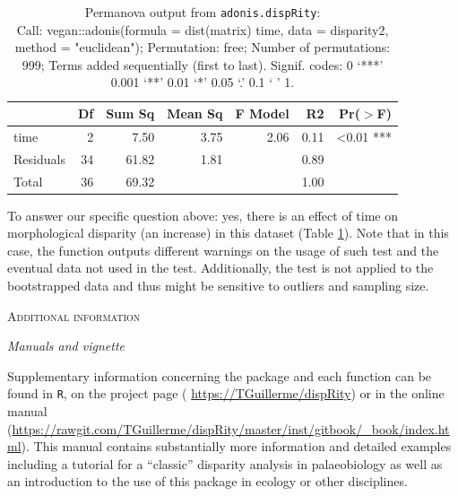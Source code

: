 \documentclass[12pt,letterpaper]{article}
\renewcommand{\section}[1]{%
\bigskip
\begin{center}
\begin{Large}
\normalfont\scshape #1
\medskip
\end{Large}
\end{center}}
\renewcommand{\subsection}[1]{%
\bigskip
\begin{center}
\begin{large}
\normalfont\itshape #1
\end{large}
\end{center}}
\begin{document}
\begin{table}[ht]
\centering
\begin{tabular}{lrrrrrr}
  \hline
              & Df & Sum Sq & Mean Sq & F Model & R2   & Pr($>$F) \\ 
  \hline
    time      & 2  &  7.50 & 3.75     & 2.06    & 0.11 & <0.01 *** \\ 
    Residuals & 34 & 61.82 & 1.81     &         & 0.89 & \\
    Total     & 36 & 69.32 &          &         & 1.00 & \\ 
   \hline
\end{tabular}
\caption{
Permanova output from \texttt{adonis.dispRity}:\\
Call: vegan::adonis(formula = dist(matrix) \texttildelow time, data = disparity2, method = "euclidean"); Permutation: free; Number of permutations: 999; Terms added sequentially (first to last). Signif. codes:  0 `***' 0.001 `**' 0.01 `*' 0.05 `.' 0.1 ` ' 1.
}
\label{Tab:anova}
\end{table}

To answer our specific question above: yes, there is an effect of time on morphological disparity (an increase) in this dataset (Table \ref{Tab:anova}).
Note that in this case, the function outputs different warnings on the usage of such test and the eventual data not used in the test.
Additionally, the test is not applied to the bootstrapped data and thus might be sensitive to outliers and sampling size.

\section{Additional information}
\subsection{Manuals and vignette}
Supplementary information concerning the package and each function can be found in \texttt{R}, on the project page (
\url{https://TGuillerme/dispRity}) or in the online manual (\url{https://rawgit.com/TGuillerme/dispRity/master/inst/gitbook/_book/index.html}).
This manual contains substantially more information and detailed examples including a tutorial for a ``classic'' disparity analysis in palaeobiology as well as an introduction to the use of this package in ecology or other disciplines. 
\end{document}
